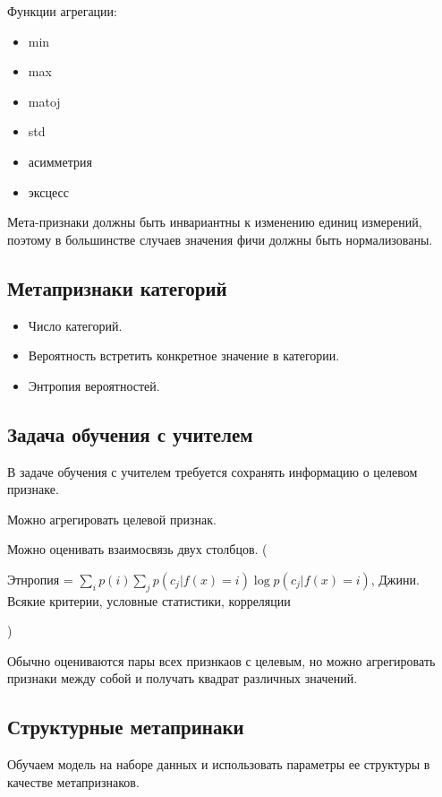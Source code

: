 Функции агрегации:
\begin{itemize}
    \item min
    \item max
    \item matoj
    \item std
    \item асимметрия
    \item эксцесс
\end{itemize}

Мета-признаки должны быть инвариантны к изменению единиц измерений,
поэтому в большинстве случаев значения фичи должны быть нормализованы.

\subsection*{Метапризнаки категорий}

\begin{itemize}
    \item Число категорий.
    \item Вероятность встретить конкретное значение в категории.
    \item Энтропия вероятностей.
\end{itemize}

\subsection*{Задача обучения с учителем}

В задаче обучения с учителем требуется сохранять информацию
о целевом признаке.

Можно агрегировать целевой признак.

Можно оценивать взаимосвязь двух столбцов. (

    Этнропия = $\sum_i p(i) \sum_j p(c_j | f(x) = i) \log p(c_j | f(x) = i)$,
    Джини.
    Всякие критерии, условные статистики, корреляции

)

Обычно оцениваются пары всех признкаов с целевым, но можно
агрегировать признаки между собой и получать квадрат различных
значений.

\subsection*{Структурные метапринаки}

Обучаем модель на наборе данных и использовать параметры
ее структуры в качестве метапризнаков.

